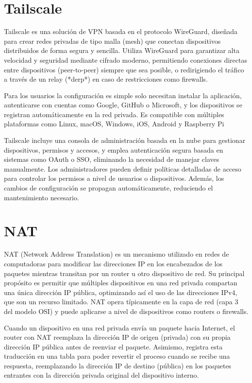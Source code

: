 \section{Tailscale}  
    Tailscale es una solución de VPN basada en el protocolo WireGuard, diseñada para crear redes privadas de tipo malla (mesh) que conectan dispositivos distribuidos de forma segura y sencilla. Utiliza WireGuard para garantizar alta velocidad y seguridad mediante cifrado moderno, permitiendo conexiones directas entre dispositivos (peer-to-peer) siempre que sea posible, o redirigiendo el tráfico a través de un relay (*derp*) en caso de restricciones como firewalls.
    
   Para los usuarios la configuración es simple solo necesitan instalar la aplicación, autenticarse con cuentas como Google, GitHub o Microsoft, y los dispositivos se registran automáticamente en la red privada. Es compatible con múltiples plataformas como Linux, macOS, Windows, iOS, Android y Raspberry Pi
   
   Tailscale incluye una consola de administración basada en la nube para gestionar dispositivos, permisos y accesos, y emplea autenticación segura basada en sistemas como OAuth o SSO, eliminando la necesidad de manejar claves manualmente. Los administradores pueden definir políticas detalladas de acceso para controlar los permisos a nivel de usuarios o dispositivos. Además, los cambios de configuración se propagan automáticamente, reduciendo el mantenimiento necesario. 

\section{NAT}
NAT (Network Address Translation) es un mecanismo utilizado en redes de computadoras para modificar las direcciones IP en los encabezados de los paquetes mientras transitan por un router u otro dispositivo de red. Su principal propósito es permitir que múltiples dispositivos en una red privada compartan una única dirección IP pública, optimizando así el uso de las direcciones IPv4, que son un recurso limitado. NAT opera típicamente en la capa de red (capa 3 del modelo OSI) y puede aplicarse a nivel de dispositivos como routers o firewalls.

Cuando un dispositivo en una red privada envía un paquete hacia Internet, el router con NAT reemplaza la dirección IP de origen (privada) con su propia dirección IP pública antes de reenviar el paquete. Asimismo, registra esta traducción en una tabla para poder revertir el proceso cuando se recibe una respuesta, reemplazando la dirección IP de destino (pública) en los paquetes entrantes con la dirección privada original del dispositivo interno.

